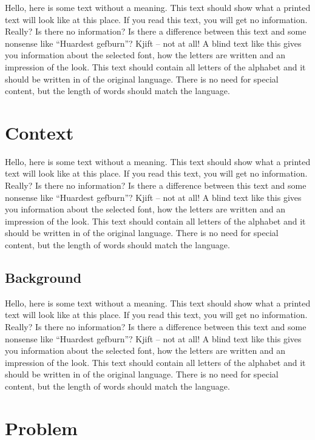 \documentclass[%
  english,%
  todotools=true,%
  trtype=singlereport,draft%
]{hpitr}
\begin{document}
Hello, here is some text without a meaning. This text should show
what a printed text will look like at this place. If you read this
text, you will get no information. Really? Is there no information?
Is there a difference between this text and some nonsense like
“Huardest gefburn”? Kjift – not at all! A blind text like this gives
you information about the selected font, how the letters are written
and an impression of the look. This text should contain all letters
of the alphabet and it should be written in of the original
language. There is no need for special content, but the length of
words should match the language.

\section{Context}
\label{sec:context}

Hello, here is some text without a meaning. This text should show
what a printed text will look like at this place. If you read this
text, you will get no information. Really? Is there no information?
Is there a difference between this text and some nonsense like
“Huardest gefburn”? Kjift – not at all! A blind text like this gives
you information about the selected font, how the letters are written
and an impression of the look. This text should contain all letters
of the alphabet and it should be written in of the original
language. There is no need for special content, but the length of
words should match the language.


\subsection{Background}
\label{sec:background}

Hello, here is some text without a meaning. This text should show
what a printed text will look like at this place. If you read this
text, you will get no information. Really? Is there no information?
Is there a difference between this text and some nonsense like
“Huardest gefburn”? Kjift – not at all! A blind text like this gives
you information about the selected font, how the letters are written
and an impression of the look. This text should contain all letters
of the alphabet and it should be written in of the original
language. There is no need for special content, but the length of
words should match the language.

\section{Problem}
\label{sec:problem}
\end{document}
